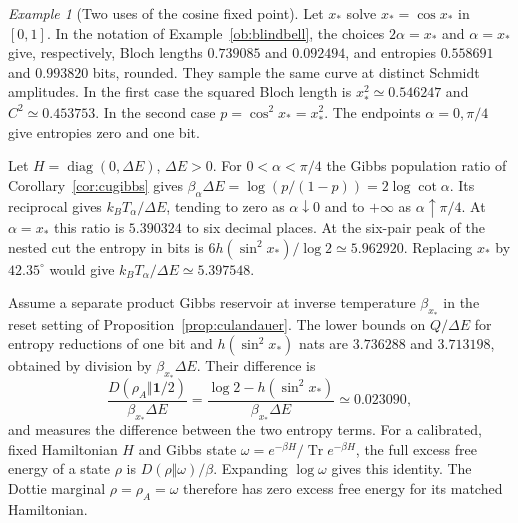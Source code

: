\documentclass[aps,pra,onecolumn,superscriptaddress,nofootinbib,10pt]{revtex4-2}
\theoremstyle{definition}
\theoremstyle{remark}
\newtheorem{example}[theorem]{Example}
\begin{document}
\begin{example}[Two uses of the cosine fixed point]\label{ob:dottiethermal}
Let \(x_*\) solve \(x_*=\cos x_*\) in \([0,1]\). In the notation of
Example~\ref{ob:blindbell}, the choices \(2\alpha=x_*\) and
\(\alpha=x_*\) give, respectively, Bloch lengths \(0.739085\) and
\(0.092494\), and entropies \(0.558691\) and \(0.993820\) bits, rounded.
They sample the same curve at distinct Schmidt amplitudes. In the first
case the squared Bloch length is \(x_*^2\simeq0.546247\) and
\(C^2\simeq0.453753\). In the second case \(p=\cos^2x_*=x_*^2\).
The endpoints \(\alpha=0,\pi/4\) give entropies zero and one bit.

Let \(H=\operatorname{diag}(0,\Delta E)\), \(\Delta E>0\).
For \(0<\alpha<\pi/4\) the Gibbs population ratio of
Corollary~\ref{cor:cugibbs} gives
\(\beta_\alpha\Delta E=\log(p/(1-p))=2\log\cot\alpha\).
Its reciprocal gives \(k_BT_\alpha/\Delta E\), tending to
zero as \(\alpha\downarrow0\) and to \(+\infty\) as
\(\alpha\uparrow\pi/4\). At \(\alpha=x_*\) this ratio is
\(5.390324\) to six decimal places. At the six-pair peak of the nested cut the entropy in bits is
\(6h(\sin^2x_*)/\log2\simeq5.962920\). Replacing \(x_*\) by \(42.35^\circ\)
would give \(k_BT_\alpha/\Delta E\simeq5.397548\).

Assume a separate product Gibbs reservoir at inverse temperature
\(\beta_{x_*}\) in the reset setting of Proposition~\ref{prop:culandauer}.
The lower bounds on \(Q/\Delta E\) for entropy reductions of one bit
and \(h(\sin^2x_*)\) nats are \(3.736288\) and \(3.713198\),
obtained by division by \(\beta_{x_*}\Delta E\).
Their difference is
\[
 \frac{D(\rho_A\Vert\mathbf1/2)}{\beta_{x_*}\Delta E}
   =\frac{\log2-h(\sin^2x_*)}{\beta_{x_*}\Delta E}
   \simeq 0.023090,
\]
and measures the difference between the two entropy terms.
For a calibrated, fixed Hamiltonian \(H\) and Gibbs state
\(\omega=e^{-\beta H}/\operatorname{Tr}e^{-\beta H}\),
the full excess free energy of a state \(\rho\) is
\(D(\rho\Vert\omega)/\beta\). Expanding \(\log\omega\) gives this
identity. The Dottie marginal \(\rho=\rho_A=\omega\) therefore
has zero excess free energy for its matched Hamiltonian.
\end{example}
\end{document}
